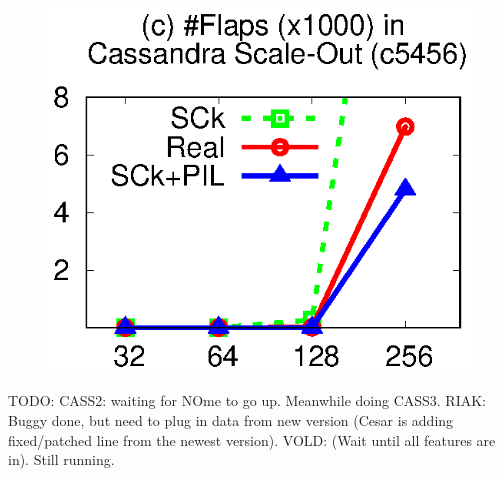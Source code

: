 \begin{figure}[t]
{\includegraphics[width=\fgw]{F/old-bugs/eps/cass4.eps}
\hminb
}


\vminfive

\vminfive
\end{figure}




TODO: CASS2: waiting for NOme to go up.
Meanwhile doing CASS3. 
%
RIAK: Buggy done, but need to plug in data from new version
(Cesar is adding fixed/patched line from the newest version).
%
VOLD: (Wait until all features are in).  Still running.
\fi
